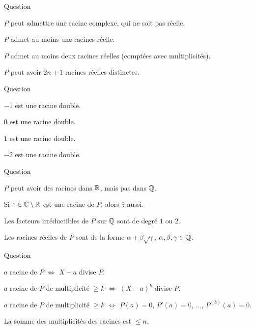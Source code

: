 \begin{multi}[multiple,feedback=
{Il y a au plus \(\deg P\) racines réelles (comptées avec multiplicité). Mais ici le degré est impair, donc \(P\) admet au moins une racine réelle.
}]{Question}
    \item* \(P\) peut admettre une racine complexe, qui ne soit pas réelle.
    \item* \(P\) admet au moins une racines réelle.
    \item \(P\) admet au moins deux racines réelles (comptées avec multiplicités).
    \item* \(P\) peut avoir \(2n+1\) racines réelles distinctes.
\end{multi}


\begin{multi}[multiple,feedback=
{Pour une racine double il faut \(P(a)=0\), \(P'(a)=0\) et \(P''(a)\neq0\).
En fait \(P(X) = X(X+2)^3(X-1)^2\).
}]{Question}
    \item \(-1\) est une racine double.
    \item \(0\) est une racine double.
    \item* \(1\) est une racine double.
    \item \(-2\) est une racine double.
\end{multi}


\begin{multi}[multiple,feedback=
{Sur \(\Qq\) les facteurs irréductibles peuvent être de n'importe quel degré.
}]{Question}
    \item* \(P\) peut avoir des racines dans \(\mathbb{R}\), mais pas dans \(\Qq\).
    \item* Si \(z\in \mathbb{C}\setminus\mathbb{R}\) est une racine de \(P\), alors \(\bar z\) aussi.
    \item Les facteurs irréductibles de \(P\) sur \(\Qq\) sont de degré \(1\) ou \(2\).
    \item Les racines réelles de \(P\) sont de la forme \(\alpha + \beta\sqrt{\gamma}\), \(\alpha,\beta,\gamma \in \mathbb{Q}\).
\end{multi}


\begin{multi}[multiple,feedback=
{\(a\) racine de \(P\) de multiplicité \(\ge k\) \(\iff\) \((X-a)^k\) divise \(P\) \(\iff\) \(P(a) = 0\), \(P'(a)=0\), ..., \(P^{(k-1)}(a)=0\).
}]{Question}
    \item* \(a\) racine de \(P\) \(\iff\) \(X-a\) divise \(P\).
    \item* \(a\) racine de \(P\) de multiplicité \(\ge k\) \(\iff\) \((X-a)^k\) divise \(P\).
    \item \(a\) racine de \(P\) de multiplicité \(\ge k\) \(\iff\)
\(P(a) = 0\), \(P'(a)=0\), ..., \(P^{(k)}(a)=0\).
    \item* La somme des multiplicités des racines est \(\le n\).
\end{multi}


